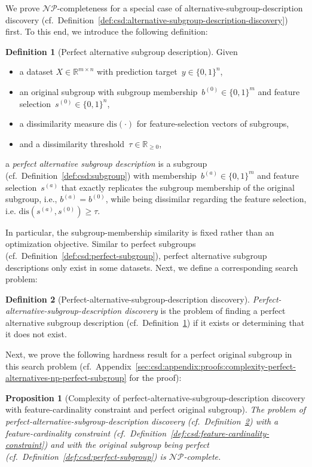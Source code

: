 \documentclass{article}
\newtheorem{proposition}{Proposition}
\theoremstyle{definition}
\newtheorem{definition}{Definition}
\begin{document}
We prove $\mathcal{NP}$-completeness for a special case of alternative-subgroup-description discovery (cf.~Definition~\ref{def:csd:alternative-subgroup-description-discovery}) first.
To this end, we introduce the following definition:
%
\begin{definition}[Perfect alternative subgroup description]
	Given
	\begin{itemize}[noitemsep]
		\item a dataset $X \in \mathbb{R}^{m \times n}$ with prediction target~$y \in \{0, 1\}^n$,
		\item an original subgroup with subgroup membership~$b^{(0)} \in \{0, 1\}^m$ and feature selection~$s^{(0)} \in \{0, 1\}^n$,
		\item a dissimilarity measure $\text{dis}(\cdot)$ for feature-selection vectors of subgroups,
		\item and a dissimilarity threshold~$\tau \in \mathbb{R}_{\geq 0}$,
	\end{itemize}
	a \emph{perfect alternative subgroup description} is a subgroup (cf.~Definition~\ref{def:csd:subgroup}) with membership~$b^{(a)} \in \{0, 1\}^m$ and feature selection~$s^{(a)}$ that exactly replicates the subgroup membership of the original subgroup, i.e., $b^{(a)} = b^{(0)}$, while being dissimilar regarding the feature selection, i.e. $\text{dis}(s^{(a)}, s^{(0)}) \geq \tau$.
	\label{def:csd:perfect-alternative}
\end{definition}
%
In particular, the subgroup-membership similarity is fixed rather than an optimization objective.
Similar to perfect subgroups (cf.~Definition~\ref{def:csd:perfect-subgroup}), perfect alternative subgroup descriptions only exist in some datasets.
Next, we define a corresponding search problem:
%
\begin{definition}[Perfect-alternative-subgroup-description discovery]
	\emph{Perfect-alternative-subgroup-description discovery} is the problem of finding a perfect alternative subgroup description (cf.~Definition~\ref{def:csd:perfect-alternative}) if it exists or determining that it does not exist.
	\label{def:csd:perfect-alternative-subgroup-description-discovery}
\end{definition}
%
Next, we prove the following hardness result for a perfect original subgroup in this search problem (cf.~Appendix~\ref{sec:csd:appendix:proofs:complexity-perfect-alternatives-np-perfect-subgroup} for the proof):
%
\begin{proposition}[Complexity of perfect-alternative-subgroup-description discovery with feature-cardinality constraint and perfect original subgroup]
	The problem of perfect-alternative-subgroup-description discovery (cf.~Definition~\ref{def:csd:perfect-alternative-subgroup-description-discovery}) with a feature-cardinality constraint (cf.~Definition~\ref{def:csd:feature-cardinality-constraint}) and with the original subgroup being perfect (cf.~Definition~\ref{def:csd:perfect-subgroup}) is $\mathcal{NP}$-complete.
	\label{prop:csd:complexity-perfect-alternatives-np-perfect-subgroup}
\end{proposition}
\end{document}
